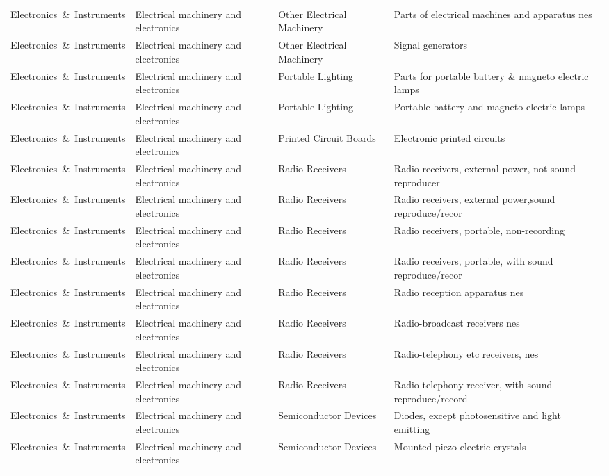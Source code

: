 \begin{appendices}
\begin{xltabular}{\textwidth}{|p{0.14\textwidth}|p{0.28\textwidth}|p{0.18\textwidth}|p{0.30\textwidth}|}
Electronics\ \&\ Instruments & Electrical machinery and electronics & Other Electrical Machinery & Parts of electrical machines and apparatus nes \\
Electronics\ \&\ Instruments & Electrical machinery and electronics & Other Electrical Machinery & Signal generators \\
Electronics\ \&\ Instruments & Electrical machinery and electronics & Portable Lighting & Parts for portable battery \& magneto electric lamps \\
Electronics\ \&\ Instruments & Electrical machinery and electronics & Portable Lighting & Portable battery and magneto-electric lamps \\
Electronics\ \&\ Instruments & Electrical machinery and electronics & Printed Circuit Boards & Electronic printed circuits \\
Electronics\ \&\ Instruments & Electrical machinery and electronics & Radio Receivers & Radio receivers, external power, not sound reproducer \\
Electronics\ \&\ Instruments & Electrical machinery and electronics & Radio Receivers & Radio receivers, external power,sound reproduce/recor \\
Electronics\ \&\ Instruments & Electrical machinery and electronics & Radio Receivers & Radio receivers, portable, non-recording \\
Electronics\ \&\ Instruments & Electrical machinery and electronics & Radio Receivers & Radio receivers, portable, with sound reproduce/recor \\
Electronics\ \&\ Instruments & Electrical machinery and electronics & Radio Receivers & Radio reception apparatus nes \\
Electronics\ \&\ Instruments & Electrical machinery and electronics & Radio Receivers & Radio-broadcast receivers nes \\
Electronics\ \&\ Instruments & Electrical machinery and electronics & Radio Receivers & Radio-telephony etc receivers, nes \\
Electronics\ \&\ Instruments & Electrical machinery and electronics & Radio Receivers & Radio-telephony receiver, with sound reproduce/record \\
Electronics\ \&\ Instruments & Electrical machinery and electronics & Semiconductor Devices & Diodes, except photosensitive and light emitting \\
Electronics\ \&\ Instruments & Electrical machinery and electronics & Semiconductor Devices & Mounted piezo-electric crystals \\

\end{xltabular}
\end{appendices}
